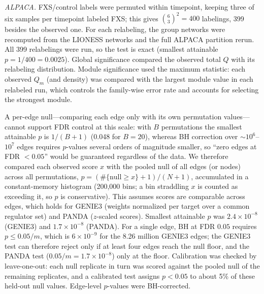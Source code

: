 \documentclass[journal]{IEEEtran}
\begin{document}
\emph{ALPACA.} FXS/control labels were permuted within timepoint, keeping three of six samples per timepoint labeled FXS; this gives $\binom{6}{3}^2=400$ labelings, 399 besides the observed one. For each relabeling, the group networks were recomputed from the LIONESS networks and the full ALPACA partition rerun. All 399 relabelings were run, so the test is exact (smallest attainable $p=1/400=0.0025$). Global significance compared the observed total $Q$ with its relabeling distribution. Module significance used the maximum statistic: each observed $Q_m$ (and density) was compared with the largest module value in each relabeled run, which controls the family-wise error rate and accounts for selecting the strongest module.

A per-edge null---comparing each edge only with its own permutation values---cannot support FDR control at this scale: with $B$ permutations the smallest attainable $p$ is $1/(B+1)$ (0.048 for $B=20$), whereas BH correction over $\sim$$10^6$--$10^7$ edges requires $p$-values several orders of magnitude smaller, so ``zero edges at FDR $<0.05$'' would be guaranteed regardless of the data. We therefore compared each observed score $x$ with the pooled null of all edges (or nodes) across all permutations, $p=(\#\{\text{null}\geq x\}+1)/(N+1)$, accumulated in a constant-memory histogram (200,000 bins; a bin straddling $x$ is counted as exceeding it, so $p$ is conservative). This assumes scores are comparable across edges, which holds for GENIE3 (weights normalized per target over a common regulator set) and PANDA ($z$-scaled scores). Smallest attainable $p$ was $2.4\times10^{-8}$ (GENIE3) and $1.7\times10^{-8}$ (PANDA). For a single edge, BH at FDR $0.05$ requires $p\leq0.05/m$, which is $6\times10^{-9}$ for the 8.26 million GENIE3 edges; the GENIE3 test can therefore reject only if at least four edges reach the null floor, and the PANDA test ($0.05/m=1.7\times10^{-8}$) only at the floor. Calibration was checked by leave-one-out: each null replicate in turn was scored against the pooled null of the remaining replicates, and a calibrated test assigns $p<0.05$ to about 5\% of these held-out null values. Edge-level $p$-values were BH-corrected.
\end{document}
